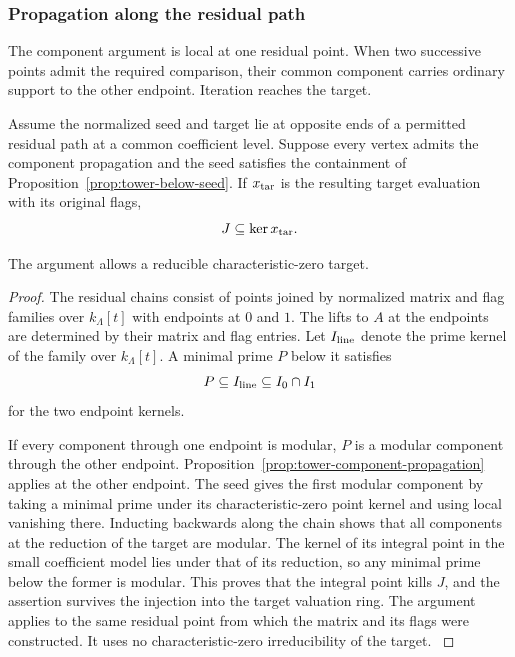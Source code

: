\subsubsection{Propagation along the residual path}
\label{par:count-two-propagation}

The component argument is local at one residual point. When two successive points admit the required comparison, their common component carries ordinary support to the other endpoint. Iteration reaches the target.

\begin{proposition}\label{prop:tower-residual-propagation}
Assume the normalized seed and target lie at opposite ends of
a permitted residual path at a common coefficient level. Suppose
every vertex admits the component propagation and the seed
satisfies the containment of Proposition~\ref{prop:tower-below-seed}.
If \(x_{\rm tar}\) is the resulting target evaluation with its original flags, 
\[
 J\subseteq\ker x_{\rm tar}.
\]

The argument allows a reducible characteristic-zero target.
\end{proposition}

\begin{proof}
The residual chains consist of points joined by normalized
matrix and flag families over \(k_\Lambda[t]\) with
endpoints at \(0\) and \(1\). The lifts to \(A\) at the
endpoints are determined by their matrix and flag entries.
Let \(I_{\rm line}\) denote the prime kernel of the family
over \(k_\Lambda[t]\). A minimal prime \(P\) below it
satisfies
\[
        P\subseteq I_{\rm line}\subseteq I_0\cap I_1
\]
for the two endpoint kernels.

If every component through one
endpoint is modular, \(P\) is a modular component through the
other endpoint. Proposition~\ref{prop:tower-component-propagation} applies at the
other endpoint. The seed gives the first modular component by
taking a minimal prime under its characteristic-zero point
kernel and using local vanishing there. Inducting backwards
along the chain shows that all components at the reduction
of the target are modular. The kernel of its integral point
in the small coefficient model lies under that of its
reduction, so any minimal prime below the former is modular.
This proves that the integral point kills \(J\), and the
assertion survives the injection into the target valuation
ring. The argument applies to the same residual point from
which the matrix and its flags were constructed. It uses
no characteristic-zero irreducibility of the target.
\label{cor:ordinary-promodularity-7}

\end{proof}


